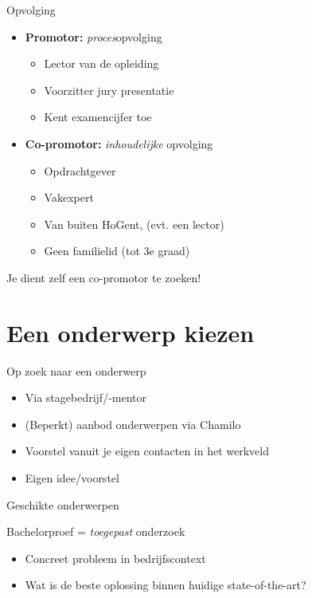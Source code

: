 \documentclass[aspectratio=169,usenames,dvipsnames]{beamer}
\begin{document}
\begin{frame}{Opvolging}
  
  \begin{itemize}
    \item \textbf{Promotor:} \emph{proces}opvolging
    \begin{itemize}
      \item Lector van de opleiding
      \item Voorzitter jury presentatie
      \item Kent examencijfer toe
    \end{itemize}
    \item \textbf{Co-promotor:} \emph{inhoudelijke} opvolging
    \begin{itemize}
      \item Opdrachtgever
      \item Vakexpert
      \item Van buiten HoGent, (evt. een lector)
      \item Geen familielid (tot 3e graad)
    \end{itemize}
  \end{itemize}

Je dient zelf een co-promotor te zoeken!

\end{frame}

\section{Een onderwerp kiezen}

\begin{frame}{Op zoek naar een onderwerp}

\begin{itemize}
  \item Via stagebedrijf/-mentor
  \item (Beperkt) aanbod onderwerpen via Chamilo
  \item Voorstel vanuit je eigen contacten in het werkveld
  \item Eigen idee/voorstel
\end{itemize}

\end{frame}

\begin{frame}{Geschikte onderwerpen}

  Bachelorproef = \emph{toegepast} onderzoek
  
  \begin{itemize}
    \item Concreet probleem in bedrijfscontext
    \item Wat is de beste oplossing binnen huidige state-of-the-art?
  \end{itemize}

\end{frame}
\end{document}
